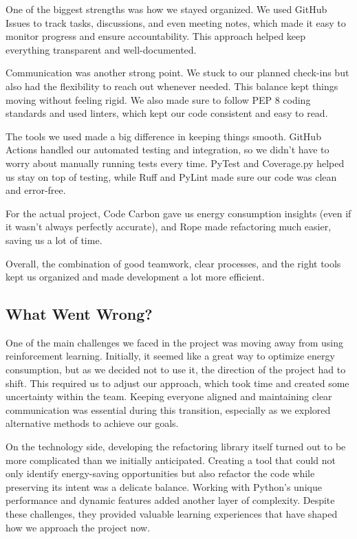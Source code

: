 \documentclass{article}
\begin{document}
One of the biggest strengths was how we stayed organized. We used GitHub Issues to track 
tasks, discussions, and even meeting notes, which made it easy to monitor progress and 
ensure accountability. This approach helped keep everything transparent and well-documented.

Communication was another strong point. We stuck to our planned check-ins but also had 
the flexibility to reach out whenever needed. This balance kept things moving without 
feeling rigid. We also made sure to follow PEP 8 coding standards and used linters, 
which kept our code consistent and easy to read.

The tools we used made a big difference in keeping things smooth. GitHub Actions handled 
our automated testing and integration, so we didn’t have to worry about manually running 
tests every time. PyTest and Coverage.py helped us stay on top of testing, while Ruff and 
PyLint made sure our code was clean and error-free.

For the actual project, Code Carbon gave us energy consumption insights (even if it 
wasn’t always perfectly accurate), and Rope made refactoring much easier, saving us a lot of time.

Overall, the combination of good teamwork, clear processes, and the right tools kept us 
organized and made development a lot more efficient.

\subsection{What Went Wrong?}


One of the main challenges we faced in the project was moving away from using 
reinforcement learning. Initially, it seemed like a great way to optimize energy 
consumption, but as we decided not to use it, the direction of the project had to 
shift. This required us to adjust our approach, which took time and created some 
uncertainty within the team. Keeping everyone aligned and maintaining clear 
communication was essential during this transition, especially as we explored 
alternative methods to achieve our goals.

On the technology side, developing the refactoring library itself turned out to 
be more complicated than we initially anticipated. Creating a tool that could not 
only identify energy-saving opportunities but also refactor the code while preserving 
its intent was a delicate balance. Working with Python's unique performance and 
dynamic features added another layer of complexity. Despite these challenges, they 
provided valuable learning experiences that have shaped how we approach the project now.
\end{document}
